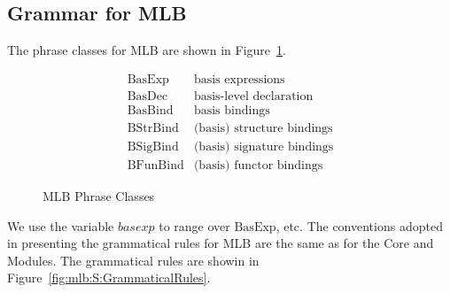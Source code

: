 \documentclass[draft]{article}
\renewcommand{\mit}[1]{\mathit{#1}}
\newcommand{\mrm}[1]{\mathrm{#1}}
\begin{document}
\subsection{Grammar for MLB}
The phrase classes for MLB are shown in
Figure~\ref{fig:mlb:S:PhraseClasses}.
\begin{figure}[h]
\begin{displaymath}
\begin{array}{ll}
\mrm{BasExp} & \mbox{basis expressions} \\
\mrm{BasDec} & \mbox{basis-level declaration} \\
\mrm{BasBind} & \mbox{basis bindings} \\
\mrm{BStrBind} & \mbox{(basis) structure bindings} \\
\mrm{BSigBind} & \mbox{(basis) signature bindings} \\
\mrm{BFunBind} & \mbox{(basis) functor bindings}
\end{array}
\end{displaymath}
\caption{MLB Phrase Classes}\label{fig:mlb:S:PhraseClasses}
\end{figure}
We use the variable $\mit{basexp}$ to range over $\mrm{BasExp}$, etc.
The conventions adopted in presenting the grammatical rules for MLB
are the same as for the Core and Modules.  The grammatical rules are
showin in Figure~\ref{fig:mlb:S:GrammaticalRules}.
\end{document}
